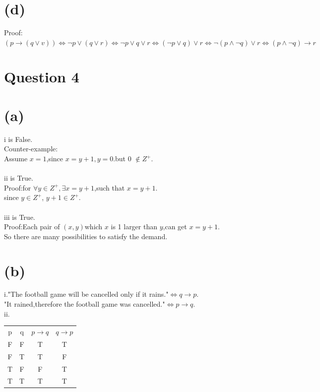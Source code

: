 \documentclass{article}
\begin{document}
\section*{(d)}
Proof:\\
\((p\longrightarrow (q \lor v))\Longleftrightarrow \lnot p \lor(q\lor r)\Longleftrightarrow \lnot p \lor q \lor r\Longleftrightarrow(\lnot p\lor q)\lor r\Longleftrightarrow \lnot(p\land \lnot q)\lor r\Longleftrightarrow(p\land \lnot q)\longrightarrow r\)\\
\section*{Question 4}

\section*{(a)}
i is False.\\Counter-example:\\Assume \(x=1\),since \(x=y+1,y=0\).but 0 \(\notin Z^{+}.\)\\\\
ii is True.\\Proof:for \(\forall y\in Z^+,\exists x=y+1\),such that \(x=y+1.\)\\
since \(y\in Z^+\), \(y+1\in Z^+\).\\\\
iii is True.\\Proof:Each pair of \((x,y)\)which \(x\) is 1 larger than \(y\),can get \(x=y+1\).\\
So there are many possibilities to satisfy the demand.

\section*{(b)}
i."The football game will be cancelled only if it rains."\(\Longleftrightarrow q\longrightarrow p.\)\\
"It rained,therefore the football game was cancelled."\(\Longleftrightarrow p\longrightarrow q.\)\\
ii.
\begin{center}
\begin{tabular}{ c c c c}
 p & q & \(p\longrightarrow q\) & \(q\longrightarrow p\) \\ 
 F & F & T & T\\  
 F & T & T & F\\
 T & F & F & T\\
 T & T & T & T\\    
\end{tabular}
\end{center}
\end{document}
